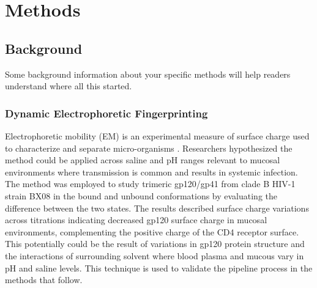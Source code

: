 %
%
%



\pagestyle{plain}
\chapter{Methods} 
\renewcommand{\thetable}{\arabic{chapter}.\arabic{table}}  
\renewcommand{\thefigure}{\arabic{chapter}.\arabic{figure}} 

\section{Background}
Some background information about your specific methods will help readers understand where all this started.
\subsection{Dynamic Electrophoretic Fingerprinting}
Electrophoretic mobility (EM) is an experimental measure of surface charge used to characterize and separate micro-organisms \citep{Mehrishi2002,Richmond1973}. Researchers hypothesized the method could be applied across saline and pH ranges relevant to mucosal environments where transmission is common and results in systemic infection. The method was employed to study trimeric gp120/gp41 from clade B HIV-1 strain BX08 \citep{Stieh2013} in the bound and unbound conformations by evaluating the difference between the two states. The results described surface charge variations across titrations indicating decreased gp120 surface charge in mucosal environments, complementing the positive charge of the CD4 receptor surface. This potentially could be the result of variations in gp120 protein structure and the interactions of surrounding solvent where blood plasma and mucous vary in pH and saline levels. This technique is used to validate the pipeline process in the methods that follow.


